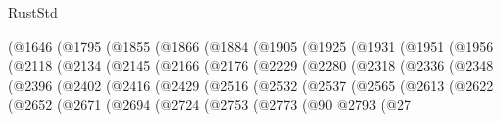 \begin{lexlean}{RustStd}
\begin{coremodule}
                      (@1646
                        (@1795
                          (@1855
                            (@1866
                              (@1884
                                (@1905
                                  (@1925
                                    (@1931
                                      (@1951
                                        (@1956
                                          (@2118
                                            (@2134
                                              (@2145
                                                (@2166
                                                  (@2176
                                                    (@2229
                                                      (@2280
                                                        (@2318
                                                          (@2336
                                                            (@2348
                                                              (@2396
                                                                (@2402
                                                                  (@2416
                                                                    (@2429
                                                                      (@2516
                                                                        (@2532
                                                                          (@2537
                                                                            (@2565
                                                                              (@2613
                                                                                (@2622
                                                                                  (@2652
                                                                                    (@2671
                                                                                      (@2694
                                                                                        (@2724
                                                                                          (@2753
                                                                                            (@2773
                                                                                              (@90
                                                                                                @2793
                                                                                                (@27

\end{coremodule}
\end{lexlean}
